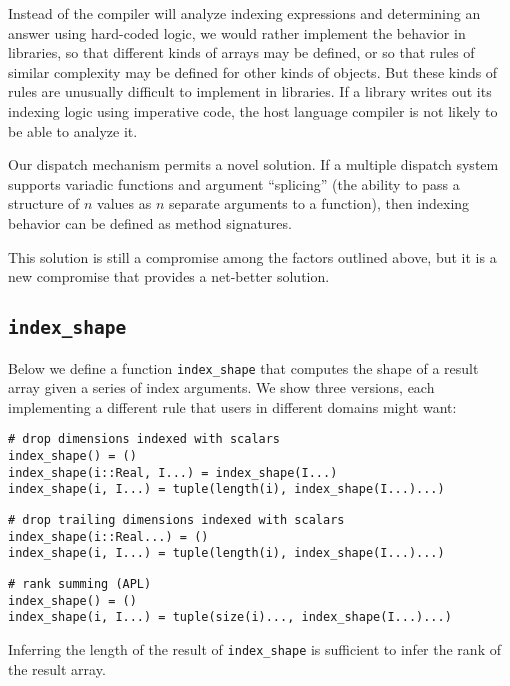 \documentclass[preprint]{sigplanconf}
\begin{document}
Instead of the compiler will analyze indexing expressions and determining an answer
using hard-coded logic, we would rather implement the
behavior in libraries, so that different kinds of arrays may be defined, or so
that rules of similar complexity may be defined for other kinds of objects.
But these kinds of rules are unusually difficult to implement in libraries. If
a library writes out its indexing logic using imperative code, the host
language compiler is not likely to be able to analyze it. 

Our dispatch mechanism permits a novel solution. If a multiple dispatch system
supports variadic functions and argument ``splicing'' (the ability to pass a
structure of $n$ values as $n$ separate arguments to a function), then
indexing behavior can be defined as method signatures.

This solution is still a compromise among the factors outlined above, but it
is a new compromise that provides a net-better solution.


\subsection{\texttt{index\_shape}}

Below we define a function \texttt{index\_shape} that computes the shape of a
result array given a series of index arguments. We show three versions, each
implementing a different rule that users in different domains might want:

\begin{verbatim}
# drop dimensions indexed with scalars
index_shape() = ()
index_shape(i::Real, I...) = index_shape(I...)
index_shape(i, I...) = tuple(length(i), index_shape(I...)...)
\end{verbatim}

\begin{verbatim}
# drop trailing dimensions indexed with scalars
index_shape(i::Real...) = ()
index_shape(i, I...) = tuple(length(i), index_shape(I...)...)
\end{verbatim}

\begin{verbatim}
# rank summing (APL)
index_shape() = ()
index_shape(i, I...) = tuple(size(i)..., index_shape(I...)...)
\end{verbatim}

Inferring the length of the result of \texttt{index\_shape} is sufficient to
infer the rank of the result array.
\end{document}

